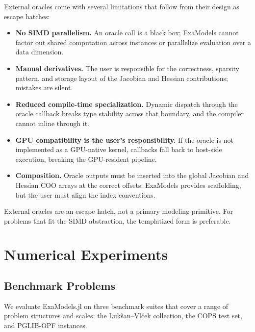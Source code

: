 \documentclass[11pt]{article}
\begin{document}
External oracles come with several limitations that follow from their design as escape hatches:
\begin{itemize}
  \item \textbf{No SIMD parallelism.} An oracle call is a black box; ExaModels cannot factor out shared computation across instances or parallelize evaluation over a data dimension.
  \item \textbf{Manual derivatives.} The user is responsible for the correctness, sparsity pattern, and storage layout of the Jacobian and Hessian contributions; mistakes are silent.
  \item \textbf{Reduced compile-time specialization.} Dynamic dispatch through the oracle callback breaks type stability across that boundary, and the compiler cannot inline through it.
  \item \textbf{GPU compatibility is the user's responsibility.} If the oracle is not implemented as a GPU-native kernel, callbacks fall back to host-side execution, breaking the GPU-resident pipeline.
  \item \textbf{Composition.} Oracle outputs must be inserted into the global Jacobian and Hessian COO arrays at the correct offsets; ExaModels provides scaffolding, but the user must align the index conventions.
\end{itemize}
External oracles are an escape hatch, not a primary modeling primitive. For problems that fit the SIMD abstraction, the templatized form is preferable.

\section{Numerical Experiments}
\label{sec:numerics}

\subsection{Benchmark Problems}
\label{sec:numerics:problems}

We evaluate ExaModels.jl on three benchmark suites that cover a range of problem structures and scales: the Luk\v{s}an--Vl\v{c}ek collection, the COPS test set, and PGLIB-OPF instances.
\end{document}
